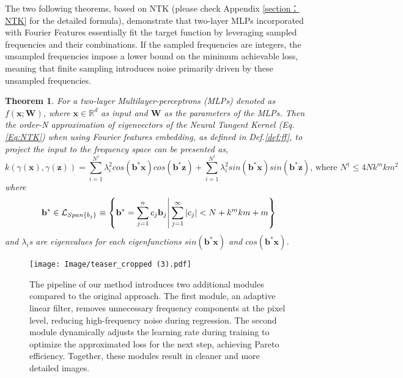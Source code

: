 The two following theorems, based on NTK (please check Appendix \ref{section：NTK} for the detailed formula), demonstrate that two-layer MLPs incorporated with Fourier Features essentially fit the target function by leveraging sampled frequencies and their combinations.
%
If the sampled frequencies are integers, the unsampled frequencies impose a lower bound on the minimum achievable loss, meaning that finite sampling introduces noise primarily driven by these unsampled frequencies.
\newtheorem{thm:1}{Theorem}
\begin{thm:1}
    For a two-layer Multilayer-perceptrons (MLPs) denoted as $f(\mathbf{x};\mathbf{W})$, where $\mathbf{x}\in\mathbb{R}^d$ as input and $\mathbf{W}$ as the parameters of the MLPs. 
    Then the order-N approximation of eigenvectors of the Neural Tangent Kernel (Eq.\ref{Eq:NTK}) when using Fourier features embedding, as defined in Def.\ref{def:ff}, to project the input to the frequency space can be presented as,
    \begin{equation}
        k(\gamma(\mathbf{x}),\gamma(\mathbf{z})) = \sum^{N^{\dag}}_{i=1} \lambda^2_i cos(\mathbf{b}^*\mathbf{x})cos(\mathbf{b}^*\mathbf{z}) + \sum^{N^{\dag}}_{i=1} \lambda^2_i sin(\mathbf{b}^*\mathbf{x})sin(\mathbf{b}^*\mathbf{z})\text{, where $N^\dag\leq 4Nk^mkm^2$}
    \end{equation}
    where 
    \begin{equation}
        \mathbf{b}^*\in \mathcal{L}_{Span\{b_j\}} \equiv \left\{   \mathbf{b}^*=\sum^n_{j=1} c_j\mathbf{b}_j\,\vline\, \sum^{\infty}_{j=1}|c_j|<N+k^mkm+m  \right\}
    \end{equation}
    and $\lambda_i$s are eigenvalues for each eigenfunctions $sin(\mathbf{b}^*\mathbf{x})$ and $cos(\mathbf{b}^*\mathbf{x})$.
\end{thm:1}
\begin{figure}[!ht]
    \centering\texttt{[image: Image/teaser\_cropped (3).pdf]}
    \caption{The pipeline of our method introduces two additional modules compared to the original approach. The first module, an adaptive linear filter, removes unnecessary frequency components at the pixel level, reducing high-frequency noise during regression. The second module dynamically adjusts the learning rate during training to optimize the approximated loss for the next step, achieving Pareto efficiency. Together, these modules result in cleaner and more detailed images.}
    \label{fig:T}
   \vspace{-15pt} 
\end{figure}
